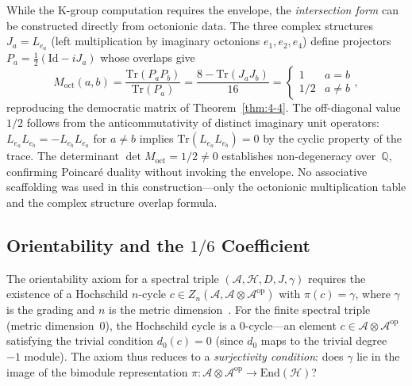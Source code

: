 \begin{remark}\label{rem:4-direct-intersection}
While the K-group computation requires the envelope, the \emph{intersection form} can be constructed directly from octonionic data. The three complex structures $J_a = L_{e_a}$ (left multiplication by imaginary octonions $e_1, e_2, e_4$) define projectors $P_a = \frac{1}{2}(\mathrm{Id} - i J_a)$ whose overlaps give
\begin{equation}
  M_{\mathrm{oct}}(a,b) = \frac{\mathrm{Tr}(P_a P_b)}{\mathrm{Tr}(P_a)} = \frac{8 - \mathrm{Tr}(J_a J_b)}{16} = \begin{cases} 1 & a = b \\ 1/2 & a \neq b \end{cases},
  \label{eq:4-intersection-direct}
\end{equation}
reproducing the democratic matrix of Theorem~\ref{thm:4-4}. The off-diagonal value $1/2$ follows from the anticommutativity of distinct imaginary unit operators: $L_{e_a} L_{e_b} = -L_{e_b} L_{e_a}$ for $a \neq b$ implies $\mathrm{Tr}(L_{e_a} L_{e_b}) = 0$ by the cyclic property of the trace. The determinant $\det M_{\mathrm{oct}} = 1/2 \neq 0$ establishes non-degeneracy over~$\mathbb{Q}$, confirming Poincar\'{e} duality without invoking the envelope. No associative scaffolding was used in this construction---only the octonionic multiplication table and the complex structure overlap formula.
\end{remark}


\subsection{Orientability and the \texorpdfstring{$1/6$}{1/6} Coefficient}
\label{sec:4-orientability-oct}

The orientability axiom for a spectral triple $(\mathcal{A}, \mathcal{H}, D, J, \gamma)$ requires the existence of a Hochschild $n$-cycle $c \in Z_n(\mathcal{A}, \mathcal{A} \otimes \mathcal{A}^{\mathrm{op}})$ with $\pi(c) = \gamma$, where $\gamma$ is the grading and $n$ is the metric dimension~\cite{ch4:Connes1994}. For the finite spectral triple (metric dimension~0), the Hochschild cycle is a 0-cycle---an element $c \in \mathcal{A} \otimes \mathcal{A}^{\mathrm{op}}$ satisfying the trivial condition $d_0(c) = 0$ (since $d_0$ maps to the trivial degree~$-1$ module). The axiom thus reduces to a \emph{surjectivity condition}: does $\gamma$ lie in the image of the bimodule representation $\pi\colon \mathcal{A} \otimes \mathcal{A}^{\mathrm{op}} \to \mathrm{End}(\mathcal{H})$?


